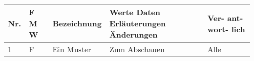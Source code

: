 \begin{center}
\begin{tabular}{|p{1cm}|p{0.5cm}|p{5cm}|p{5cm}|p{1.5cm}|}\hline
\textbf{Nr.} & \textbf{F M W} & \textbf{Bezeichnung} & \textbf{Werte Daten Erläuterungen Änderungen} & \textbf{Ver- ant- wort- lich}\\\hline
 1 & F & Ein Muster & Zum Abschauen & Alle\\ \hline
\end{tabular}
\end{center}
